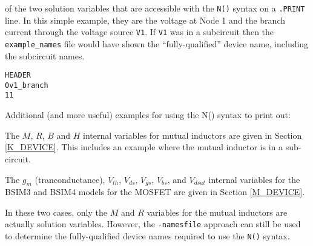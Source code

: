 of the two solution variables that are accessible with the {\tt N()} syntax on a {\tt .PRINT} line.
In this simple example, they are the voltage at Node 1 and the branch current through the voltage
source {\tt V1}.  If {\tt V1} was in a subcircuit then the \texttt{example\_names} file would have shown
the ``fully-qualified'' device name, including the subcircuit names.
\begin{alltt}
HEADER
	0	   v1_branch
	1	           1
\end{alltt}
Additional (and more useful) examples for using the N() syntax to print out:
\begin{XyceItemize}
\item The $M$, $R$, $B$ and $H$ internal variables for mutual inductors are given in Section
   \ref{K_DEVICE}.  This includes an example where the mutual inductor is in a sub-circuit.
\item The $g_{m}$ (tranconductance), $V_{th}$, $V_{ds}$, $V_{gs}$, $V_{bs}$, and $V_{dsat}$ 
   internal variables for the BSIM3 and BSIM4 models for the MOSFET are given in 
   Section \ref{M_DEVICE}.
\end{XyceItemize}
In these two cases, only the $M$ and $R$ variables for the mutual inductors are
actually solution variables.  However, the {\tt -namesfile} approach can still be
used to determine the fully-qualified \Xyce{} device names required to use the {\tt N()}
syntax.

